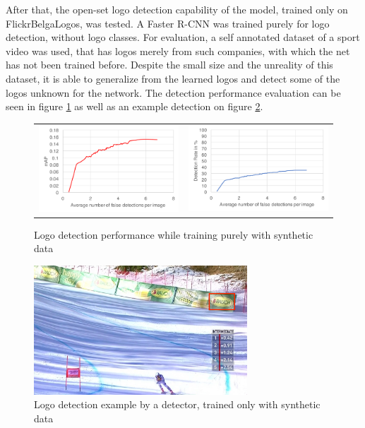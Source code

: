 After that, the open-set logo detection capability of the model, trained only on FlickrBelgaLogos, was tested. A Faster R-CNN was trained purely for logo detection, without logo classes. For evaluation, a self annotated dataset of a sport video was used, that has logos merely from such companies, with which the net has not been trained before. Despite the small size and the unreality of this dataset, it is able to generalize from the learned logos and detect some of the logos unknown for the network. The detection performance evaluation can be seen in figure \ref{f:flbldeteval} as well as an example detection on figure \ref{f:flbldetexample}.

\begin{figure}
  \centering
  \begin{tabular}{cc}
    \includegraphics[width=80mm]{images/mt/flbl_det_map.pdf} & \includegraphics[width=80mm]{images/mt/flbl_det_froc.pdf}
  \end{tabular}
  \caption{Logo detection performance while training purely with synthetic data}
  \label{f:flbldeteval}
\end{figure}
\begin{figure}
  \centering
  \includegraphics[width=80mm]{images/mt/flbl_det.png}
  \caption{Logo detection example by a detector, trained only with synthetic data}
  \label{f:flbldetexample}
\end{figure}
\bigbreak
